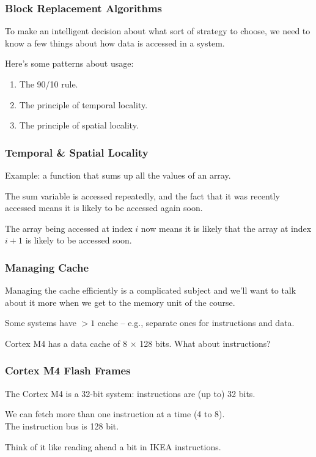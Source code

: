 \begin{frame}
\frametitle{Block Replacement Algorithms}
To make an intelligent decision about what sort of strategy to choose, we need to know a few things about how data is accessed in a system.

Here's some patterns about usage:\\
\begin{enumerate}
	\item The 90/10 rule.
	\item The principle of \alert{temporal locality}. 
	\item The principle of \alert{spatial locality}.
\end{enumerate}

\end{frame}

\begin{frame}
\frametitle{Temporal \& Spatial Locality}

Example: a function that sums up all the values of an array. 

The sum variable is accessed repeatedly, and the fact that it was recently accessed means it is likely to be accessed again soon. 

The array being accessed at index $i$ now means it is likely that the array at index $i+1$ is likely to be accessed soon.

\end{frame}

\begin{frame}
\frametitle{Managing Cache}

Managing the cache efficiently is a complicated subject and we'll want to talk about it more when we get to the memory unit of the course.

Some systems have $> 1$ cache -- e.g., separate ones for instructions and data.

Cortex M4 has a data cache of 8 $\times$ 128 bits. What about instructions?

\end{frame}


\begin{frame}
\frametitle{Cortex M4 Flash Frames}

The Cortex M4 is a 32-bit system: instructions are (up to) 32 bits.

We can fetch more than one instruction at a time (4 to 8).\\
\quad The instruction bus is 128 bit.

Think of it like reading ahead a bit in IKEA instructions.

\end{frame}

